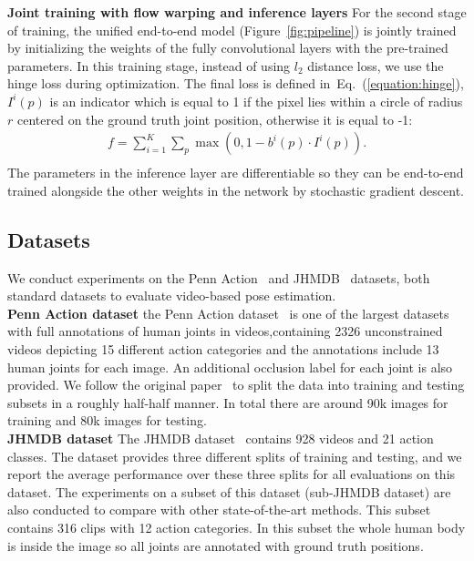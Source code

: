 \documentclass[10pt,twocolumn,letterpaper]{article}
\newcommand{\figref}[1]{Figure~\ref{#1}}
\newcommand{\refequ}[1]{Eq.~(\ref{#1})}
\begin{document}
\noindent\textbf{Joint training with flow warping and inference layers}
For the second stage of training, the unified end-to-end model (\figref{fig:pipeline}) is jointly trained by initializing the weights of the fully convolutional layers with the pre-trained parameters. In this training stage, instead of using $l_2$ distance loss, we use the hinge loss during optimization. The final loss is defined in~\refequ{equation:hinge},
$I^i(p)$ is an indicator which is equal to 1 if the pixel lies within a circle of radius $r$ centered on the ground truth joint position, otherwise it is equal to -1:
\begin{equation}
\begin{aligned}
f = \sum_{i=1}^K\sum_{p}  \max(0,1-b^i(p)\cdot I^i(p)).\\
\end{aligned}
\label{equation:hinge}
\end{equation}
The parameters in the inference layer are differentiable so they can be end-to-end trained alongside the other weights in the  network by stochastic gradient descent.




\subsection{Datasets}\noindent We conduct experiments on the Penn Action~\cite{Zhang2013From} and JHMDB~\cite{Jhuang:ICCV:2013} datasets, both standard datasets to evaluate video-based pose estimation.\\

\noindent\textbf{Penn Action dataset}
the Penn Action dataset~\cite{Zhang2013From} is one of the largest datasets with full annotations of human joints in videos,containing 2326 unconstrained videos depicting 15 different action categories and the annotations include 13 human joints for each image. An additional occlusion label for each joint is also provided. We follow the original paper~\cite{Zhang2013From} to split the data into training and testing subsets in a roughly half-half manner. In total there are around 90k images for training and 80k images for testing.\\

\noindent\textbf{JHMDB dataset}
The JHMDB dataset~\cite{Jhuang:ICCV:2013} contains 928 videos and 21 action classes. The dataset provides three different splits of training and testing, and we report the average performance over these three splits for all evaluations on this dataset. The experiments on a subset of this dataset (sub-JHMDB dataset) are also conducted to compare with other state-of-the-art methods. This subset contains 316 clips with 12 action categories. In this subset the whole human body is inside the image so all joints are annotated with ground truth positions.
\end{document}
